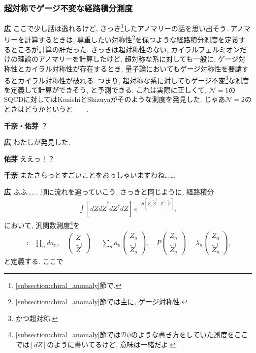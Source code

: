 \documentclass{ltjsarticle}
\theoremstyle{definition}
\newcommand{\parno}{\par\noindent}
\begin{document}
\subsubsection{超対称でゲージ不変な経路積分測度}\label{sec:measure}
\noindent
\textbf{広} ここで少し話は逸れるけど, さっき\footnote{\ref{subsection:chiral_anomaly}節で.}したアノマリーの話を思い出そう. アノマリーを計算するときは, 尊重したい対称性\footnote{\ref{subsection:chiral_anomaly}節では主に, ゲージ対称性.}を保つような経路積分測度を定義するところが計算の肝だった. さっきは超対称性のない, カイラルフェルミオンだけの理論のアノマリーを計算したけど, 超対称な系に対しても一般に, ゲージ対称性とカイラル対称性が存在するとき, 量子論においてもゲージ対称性を要請するとカイラル対称性が破れる. つまり, 超対称な系に対してもゲージ不変\footnote{かつ超対称.}な測度を定義して計算ができそう, と予測できる. これは実際に正しくて, $\mathcal N=1$のSQCDに対してはKonishiとShizuyaがそのような測度を発見した. じゃあ$\mathcal N=2$のときはどうかというと------.\parno
\textbf{千奈・佑芽} ？\parno
\textbf{広} わたしが発見した.\parno
\textbf{佑芽} ええっ！？\parno
\textbf{千奈} またさらっとすごいことをおっしゃいますわね…….\parno
\textbf{広} ふふ……. 順に流れを追っていこう. さっきと同じように, 経路積分
\begin{align}
\int [dZd\tilde Z^\dagger dZ^\dagger d\tilde Z]\,e^{-S[Z,\tilde Z^\dagger,Z^\dagger,\tilde Z]},
\end{align}
において, 汎関数測度\footnote{\ref{subsection:chiral_anomaly}節では$\mathcal D\psi$のような書き方をしていた測度をここでは$[dZ]$のように書いてるけど, 意味は一緒だよ.}を
\begin{align}
[dZd\tilde Z^\dagger]\coloneqq\prod_nda_n,\quad
\begin{pmatrix}
Z\\\tilde Z^\dagger
\end{pmatrix}
=\sum_na_n
\begin{pmatrix}
Z_n\\\tilde Z^\dagger_n
\end{pmatrix},
\quad P
\begin{pmatrix}
Z_n\\\tilde Z^\dagger_n
\end{pmatrix}=\lambda_n
\begin{pmatrix}
Z_n\\\tilde Z^\dagger_n
\end{pmatrix},\label{eq:measure}
\end{align}
と定義する. ここで
\end{document}
